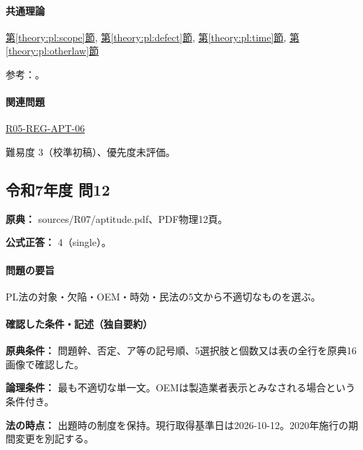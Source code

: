 \paragraph{共通理論} \hyperref[theory:pl:scope]{第\ref*{theory:pl:scope}節}, \hyperref[theory:pl:defect]{第\ref*{theory:pl:defect}節}, \hyperref[theory:pl:time]{第\ref*{theory:pl:time}節}, \hyperref[theory:pl:otherlaw]{第\ref*{theory:pl:otherlaw}節}

\par 参考：\cite{pl_statute,pl_qa,pl_nuclear_statute,pl_transition2020}。

\paragraph{関連問題} \hyperref[q:r05-reg-apt-06]{R05-REG-APT-06}

\par 難易度 3（校準初稿）、優先度未評価。

\subsection{令和7年度 問12}
\label{q:r07-reg-apt-12}

\noindent\textbf{原典：} sources/R07/aptitude.pdf、PDF物理12頁。

\textbf{公式正答：} 4（single）。

\paragraph{問題の要旨} PL法の対象・欠陥・OEM・時効・民法の5文から不適切なものを選ぶ。

\paragraph{確認した条件・記述（独自要約）}\mbox{}\par

\noindent\textbf{原典条件：} 問題幹、否定、ア等の記号順、5選択肢と個数又は表の全行を原典16画像で確認した。\par

\noindent\textbf{論理条件：} 最も不適切な単一文。OEMは製造業者表示とみなされる場合という条件付き。\par

\noindent\textbf{法の時点：} 出題時の制度を保持。現行取得基準日は2026-10-12。2020年施行の期間変更を別記する。\par


